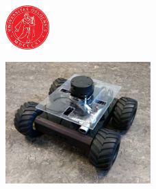\documentclass[a4paper,10pt]{article}
\begin{document}
\begin{titlepage}
	
	
	\vfill\vfill\vfill\vfill\vfill\vfill\vfill\vfill\vfill\vfill\vfill\vfil\vfill\vfill\vfill\vfill\vfill\vfill\vfill\vfill\vfill\vfill\vfill\vfill\vfill\vfill\vfill\vfill%
	
	
	
	\begin{figure}[H]
	\raggedright
	 \includegraphics[width=0.15\textwidth]{uiologo.png}
	\end{figure}
	 
	
	\vfill %
	
\end{titlepage}



\renewcommand{\labelenumi}{\alph{enumi})}


	\begin{figure}[H]
	\centering
	 \includegraphics[width=0.5\textwidth]{rover_pic.png}
	\end{figure}
\end{document}
